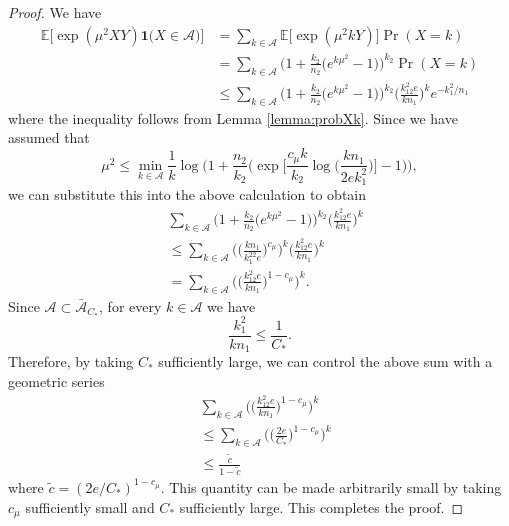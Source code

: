 \documentclass{article}
\newcommand{\cA}{\mathcal{A}}
\newcommand{\EE}{\mathbb{E}}
\newcommand{\one}{\mathbf{1}}
\newcommand{\Ct}{C_{*}}
\begin{document}
\begin{proof}
    We have 
    \begin{align*}
        \EE\Big[\exp(\mu^2XY)\one\Big(X  \in \cA\Big)\Big] &= \sum_{k \in \cA}\EE\Big[\exp(\mu^2kY)\Big]\Pr(X = k) \\
        &= \sum_{k \in \cA}\Big(1 + \frac{k_2}{n_2}\big(e^{k\mu^2} - 1\big)\Big)^{k_2}\Pr(X = k) \\
        &\leq \sum_{k \in \cA}\Big(1 + \frac{k_2}{n_2}\big(e^{k\mu^2} - 1\big)\Big)^{k_2}\Big(\frac{k^2_12e}{kn_1}\Big)^ke^{-k_1^2/n_1}
    \end{align*}
    where the inequality follows from Lemma \ref{lemma:probXk}. Since we have assumed that
     \[\mu^2 \leq \min_{k \in \cA}\frac{1}{k}\log\Bigg(1 + \frac{n_2}{k_2}\bigg(\exp\Big[\frac{c_\mu k}{k_2}\log\big(\frac{kn_1}{2ek_1^2}\big)\Big] - 1\bigg)\Bigg),\]
    we can substitute this into the above calculation to obtain
    \begin{align*}
        &\sum_{k \in \cA}\Big(1 + \frac{k_2}{n_2}\big(e^{k\mu^2} - 1\big)\Big)^{k_2}\Big(\frac{k^2_12e}{kn_1}\Big)^k \\ 
        &\leq \sum_{k \in \cA}\Bigg(\Big(\frac{kn_1}{k_1^22e}\Big)^{c_\mu}\Bigg)^k\Bigg(\frac{k^2_12e}{kn_1}\Bigg)^k \\ 
        &= \sum_{k \in \cA}\Bigg(\Big(\frac{k^2_12e}{kn_1}\Big)^{1-c_\mu}\Bigg)^k.
    \end{align*}
    Since $\cA \subset \bar{\cA}_{\Ct}$, for every $k \in \cA$ we have     
    $$\frac{k_1^2}{kn_1} \leq \frac{1}{\Ct}.$$
    Therefore, by taking $\Ct$ sufficiently large, we can control the above sum with a geometric series
    \begin{align*}
        &\sum_{k \in \cA}\Bigg(\Big(\frac{k^2_12e}{kn_1}\Big)^{1-c_\mu}\Bigg)^k \\
        &\leq \sum_{k \in \cA}\Bigg(\Big(\frac{2e}{\Ct}\Big)^{1-c_\mu}\Bigg)^k \\
        &\leq \frac{\tilde c}{1 - \tilde c}
    \end{align*}
    where $\tilde c = (2e/\Ct)^{1 - c_\mu}$. This quantity can be made arbitrarily small by taking $c_\mu$ sufficiently small and $\Ct$ sufficiently large. This completes the proof.
\end{proof}
\end{document}
